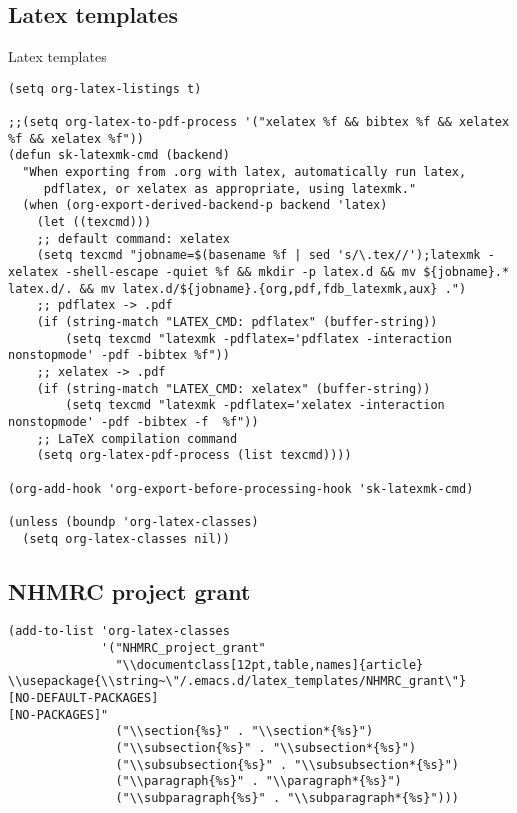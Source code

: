 \documentclass[12pt]{article}
\begin{document}
\subsection{Latex templates}
\label{sec-5-11}
Latex templates
\lstset{language=Lisp,label= ,caption= ,numbers=none}
\begin{lstlisting}
(setq org-latex-listings t)

;;(setq org-latex-to-pdf-process '("xelatex %f && bibtex %f && xelatex %f && xelatex %f"))
(defun sk-latexmk-cmd (backend)
  "When exporting from .org with latex, automatically run latex,
     pdflatex, or xelatex as appropriate, using latexmk."
  (when (org-export-derived-backend-p backend 'latex)
    (let ((texcmd)))
    ;; default command: xelatex
    (setq texcmd "jobname=$(basename %f | sed 's/\.tex//');latexmk -xelatex -shell-escape -quiet %f && mkdir -p latex.d && mv ${jobname}.* latex.d/. && mv latex.d/${jobname}.{org,pdf,fdb_latexmk,aux} .")
    ;; pdflatex -> .pdf
    (if (string-match "LATEX_CMD: pdflatex" (buffer-string))
        (setq texcmd "latexmk -pdflatex='pdflatex -interaction nonstopmode' -pdf -bibtex %f"))
    ;; xelatex -> .pdf
    (if (string-match "LATEX_CMD: xelatex" (buffer-string))
        (setq texcmd "latexmk -pdflatex='xelatex -interaction nonstopmode' -pdf -bibtex -f  %f"))
    ;; LaTeX compilation command
    (setq org-latex-pdf-process (list texcmd))))

(org-add-hook 'org-export-before-processing-hook 'sk-latexmk-cmd)

(unless (boundp 'org-latex-classes)
  (setq org-latex-classes nil))
\end{lstlisting}

\subsection{NHMRC project grant}
\label{sec-5-12}

\lstset{language=Lisp,label= ,caption= ,numbers=none}
\begin{lstlisting}
(add-to-list 'org-latex-classes
             '("NHMRC_project_grant"
               "\\documentclass[12pt,table,names]{article}
\\usepackage{\\string~\"/.emacs.d/latex_templates/NHMRC_grant\"}
[NO-DEFAULT-PACKAGES]
[NO-PACKAGES]"
               ("\\section{%s}" . "\\section*{%s}")
               ("\\subsection{%s}" . "\\subsection*{%s}")
               ("\\subsubsection{%s}" . "\\subsubsection*{%s}")
               ("\\paragraph{%s}" . "\\paragraph*{%s}")
               ("\\subparagraph{%s}" . "\\subparagraph*{%s}")))
\end{lstlisting}
\end{document}
